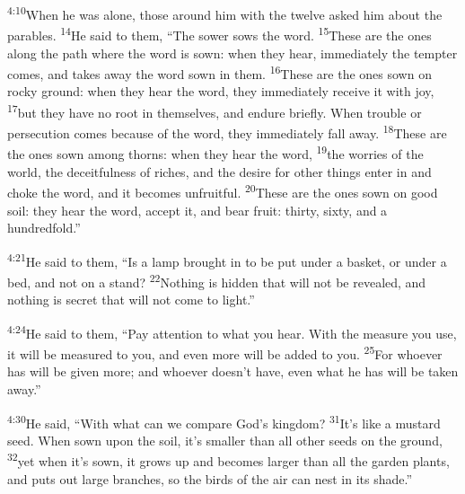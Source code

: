 \documentclass[openany,12pt,english]{book}
\newenvironment{para}{\par\pretolerance=100\tolerance=200\setlength{\emergencystretch}{0.6em}\relax}{\par}
\begin{document}
\begin{para}
    \textsuperscript{4:10}\thinspace{}When he was a\-lone, those a\-round him with the twelve asked him a\-bout the parables.
    \textsuperscript{14}\thinspace{}He said to them, “The sower sows the word.
    \textsuperscript{15}\thinspace{}These are the ones a\-long the path where the word is sown: when they hear, im\-me\-di\-ate\-ly the temp\-ter co\-mes, and takes a\-way the word sown in them.
    \textsuperscript{16}\thinspace{}These are the ones sown on rock\-y ground: when they hear the word, they im\-me\-di\-ate\-ly re\-ceive it with joy,
    \textsuperscript{17}\thinspace{}but they have no root in them\-selves, and en\-dure brief\-ly. When trou\-ble or per\-se\-cu\-tion co\-mes be\-cause of the word, they im\-me\-di\-ate\-ly fall a\-way.
    \textsuperscript{18}\thinspace{}These are the ones sown a\-mong thorns: when they hear the word,
    \textsuperscript{19}\thinspace{}the worries of the world, the de\-ceit\-ful\-ness of rich\-es, and the de\-sire for oth\-er things en\-ter in and choke the word, and it becomes un\-fruit\-ful.
    \textsuperscript{20}\thinspace{}These are the ones sown on good soil: they hear the word, ac\-cept it, and bear fruit: thir\-ty, six\-ty, and a hun\-dred\-fold.”
\end{para}

\bigskip{}

\begin{para}
    \textsuperscript{4:21}\thinspace{}He said to them, “Is a lamp brought in to be put un\-der a bas\-ket, or un\-der a bed, and not on a stand?
    \textsuperscript{22}\thinspace{}Noth\-ing is hid\-den that will not be revealed, and noth\-ing is se\-cret that will not come to light.”
\end{para}

\begin{para}
    \textsuperscript{4:24}\thinspace{}He said to them, “Pay at\-ten\-tion to what you hear. With the meas\-ure you use, it will be meas\-ured to you, and e\-ven more will be added to you.
    \textsuperscript{25}\thinspace{}For who\-ev\-er has will be giv\-en more; and who\-ev\-er does\-n't have, e\-ven what he has will be tak\-en a\-way.”
\end{para}

\bigskip{}

\begin{para}
    \textsuperscript{4:30}\thinspace{}He said, “With what can we com\-pare God's king\-dom?
    \textsuperscript{31}\thinspace{}It's like a mus\-tard seed. When sown up\-on the soil, it's smaller than all oth\-er seeds on the ground,
    \textsuperscript{32}\thinspace{}yet when it's sown, it grows up and becomes larg\-er than all the gar\-den plants, and puts out large branches, so the birds of the air can nest in its shade.”
\end{para}
\end{document}

